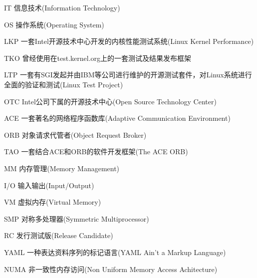 
\begin{denotation}
\item[IT] 信息技术(Information Technology)
\item[OS] 操作系统(Operating System)
\item[LKP] 一套Intel开源技术中心开发的内核性能测试系统(Linux Kernel Performance)
\item[TKO] 曾经使用在test.kernel.org上的一套测试及结果发布框架
\item[LTP] 一套有SGI发起并由IBM等公司进行维护的开源测试套件，对Linux系统进行全面的验证和测试(Linux Test Project)
\item[OTC] Intel公司下属的开源技术中心(Open Source Technology Center)
\item[ACE] 一套著名的网络程序函数库(Adaptive Communication Environment)
\item[ORB] 对象请求代管者(Object Request Broker) 
\item[TAO] 一套结合ACE和ORB的软件开发框架(The ACE ORB)
\item[MM] 内存管理(Memory Management)
\item[I/O] 输入输出(Input/Output)
\item[VM] 虚拟内存(Virtual Memory)
\item[SMP] 对称多处理器(Symmetric Multiprocessor)
\item[RC] 发行测试版(Release Candidate)
\item[YAML] 一种表达资料序列的标记语言(YAML Ain't a Markup Language)
\item[NUMA] 非一致性内存访问(Non Uniform Memory Access Achitecture)

\end{denotation}